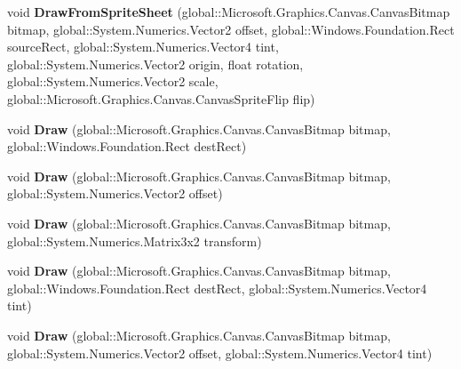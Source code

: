 \begin{DoxyCompactItemize}
void {\bfseries Draw\+From\+Sprite\+Sheet} (global\+::\+Microsoft.\+Graphics.\+Canvas.\+Canvas\+Bitmap bitmap, global\+::\+System.\+Numerics.\+Vector2 offset, global\+::\+Windows.\+Foundation.\+Rect source\+Rect, global\+::\+System.\+Numerics.\+Vector4 tint, global\+::\+System.\+Numerics.\+Vector2 origin, float rotation, global\+::\+System.\+Numerics.\+Vector2 scale, global\+::\+Microsoft.\+Graphics.\+Canvas.\+Canvas\+Sprite\+Flip flip)
\item 
\mbox{\label{interface_microsoft_1_1_graphics_1_1_canvas_1_1_i_canvas_sprite_batch_a523bb7703d792520261dec0792f80b61}} 
void {\bfseries Draw} (global\+::\+Microsoft.\+Graphics.\+Canvas.\+Canvas\+Bitmap bitmap, global\+::\+Windows.\+Foundation.\+Rect dest\+Rect)
\item 
\mbox{\label{interface_microsoft_1_1_graphics_1_1_canvas_1_1_i_canvas_sprite_batch_a772228b4cde10ff970a8e93625163bd8}} 
void {\bfseries Draw} (global\+::\+Microsoft.\+Graphics.\+Canvas.\+Canvas\+Bitmap bitmap, global\+::\+System.\+Numerics.\+Vector2 offset)
\item 
\mbox{\label{interface_microsoft_1_1_graphics_1_1_canvas_1_1_i_canvas_sprite_batch_ab0083cf0eb076b27d60e179234004436}} 
void {\bfseries Draw} (global\+::\+Microsoft.\+Graphics.\+Canvas.\+Canvas\+Bitmap bitmap, global\+::\+System.\+Numerics.\+Matrix3x2 transform)
\item 
\mbox{\label{interface_microsoft_1_1_graphics_1_1_canvas_1_1_i_canvas_sprite_batch_a858a891f85b1b06333536091c54eefac}} 
void {\bfseries Draw} (global\+::\+Microsoft.\+Graphics.\+Canvas.\+Canvas\+Bitmap bitmap, global\+::\+Windows.\+Foundation.\+Rect dest\+Rect, global\+::\+System.\+Numerics.\+Vector4 tint)
\item 
\mbox{\label{interface_microsoft_1_1_graphics_1_1_canvas_1_1_i_canvas_sprite_batch_a74de3e1e7c2648ca4c114b88d8751e12}} 
void {\bfseries Draw} (global\+::\+Microsoft.\+Graphics.\+Canvas.\+Canvas\+Bitmap bitmap, global\+::\+System.\+Numerics.\+Vector2 offset, global\+::\+System.\+Numerics.\+Vector4 tint)

\end{DoxyCompactItemize}
